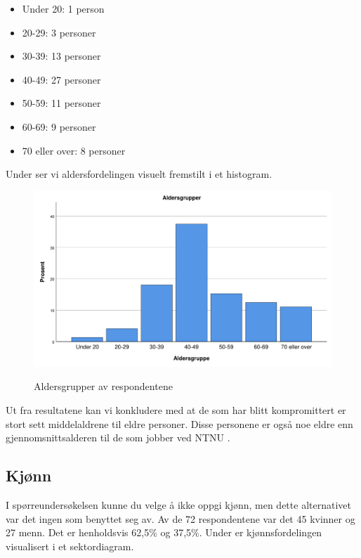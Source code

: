\begin{itemize}
    \item Under 20: 1 person
    \item 20-29: 3 personer
    \item 30-39: 13 personer
    \item 40-49: 27 personer
    \item 50-59: 11 personer
    \item 60-69: 9 personer
    \item 70 eller over: 8 personer
\end{itemize}

Under ser vi aldersfordelingen visuelt fremstilt i et histogram.

\begin{figure}[H]
    \centering
    \includegraphics[scale=0.5]{case_2/bilder/spss/aldersgrupper.pdf}
    \label{fig:aldersgruppe}
    \caption[aldersgruppe]{Aldersgrupper av respondentene}
\end{figure}

Ut fra resultatene kan vi konkludere med at de som har blitt kompromittert er stort sett middelaldrene til eldre personer. Disse personene er også noe eldre enn gjennomsnittsalderen til de som jobber ved NTNU \cite{MorkRapport}. 

\subsection{Kjønn}
I spørreundersøkelsen kunne du velge å ikke oppgi kjønn, men dette alternativet var det ingen som benyttet seg av. Av de 72 respondentene var det 45 kvinner og 27 menn. Det er henholdsvis 62,5\% og 37,5\%. Under er kjønnsfordelingen visualisert i et sektordiagram.


